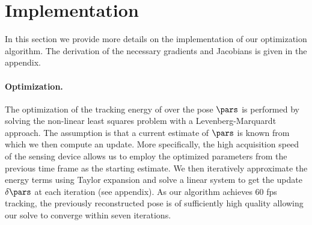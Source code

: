 


\section{Implementation}
\label{sec:implementation}
%


In this section we provide more details on the implementation of our optimization algorithm. The derivation of the necessary gradients and Jacobians is given in the appendix.

\paragraph*{Optimization.} The optimization of the tracking energy of  over the pose $\pars$ 
is performed by solving the non-linear least squares problem with a Levenberg-Marquardt approach. 
The assumption is that a current estimate of $\pars$ is known from which we then compute an update. More specifically, the high acquisition speed of the sensing device allows us to employ the optimized parameters from the previous time frame as the starting estimate. We then iteratively approximate the energy terms using Taylor expansion and solve a linear system to get the update $\delta\pars$ at each iteration (see appendix).
As our algorithm achieves 60 fps tracking, the previously reconstructed pose is of sufficiently high quality allowing our solve to converge within seven iterations.

